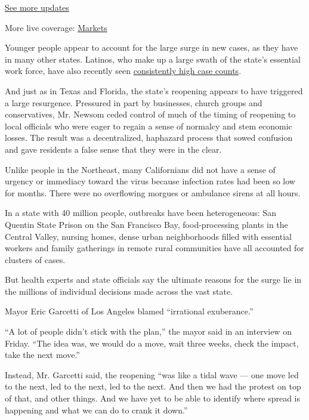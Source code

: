 \href{https://www.nytimes3xbfgragh.onion/2020/08/04/world/coronavirus-cases.html?action=click\&pgtype=Article\&state=default\&region=MAIN_CONTENT_1\&context=storylines_live_updates}{See
more updates}

More live coverage:
\href{https://www.nytimes3xbfgragh.onion/live/2020/08/04/business/stock-market-today-coronavirus?action=click\&pgtype=Article\&state=default\&region=MAIN_CONTENT_1\&context=storylines_live_updates}{Markets}

Younger people appear to account for the large surge in new cases, as
they have in many other states. Latinos, who make up a large swath of
the state's essential work force, have also recently seen
\href{https://www.nytimes3xbfgragh.onion/2020/06/26/us/corona-virus-latinos.html}{consistently
high case counts}.

And just as in Texas and Florida, the state's reopening appears to have
triggered a large resurgence. Pressured in part by businesses, church
groups and conservatives, Mr. Newsom ceded control of much of the timing
of reopening to local officials who were eager to regain a sense of
normalcy and stem economic losses. The result was a decentralized,
haphazard process that sowed confusion and gave residents a false sense
that they were in the clear.

Unlike people in the Northeast, many Californians did not have a sense
of urgency or immediacy toward the virus because infection rates had
been so low for months. There were no overflowing morgues or ambulance
sirens at all hours.

In a state with 40 million people, outbreaks have been heterogeneous:
San Quentin State Prison on the San Francisco Bay, food-processing
plants in the Central Valley, nursing homes, dense urban neighborhoods
filled with essential workers and family gatherings in remote rural
communities have all accounted for clusters of cases.

But health experts and state officials say the ultimate reasons for the
surge lie in the millions of individual decisions made across the vast
state.

Mayor Eric Garcetti of Los Angeles blamed ``irrational exuberance.''

``A lot of people didn't stick with the plan,'' the mayor said in an
interview on Friday. ``The idea was, we would do a move, wait three
weeks, check the impact, take the next move.''

Instead, Mr. Garcetti said, the reopening ``was like a tidal wave ---
one move led to the next, led to the next, led to the next. And then we
had the protest on top of that, and other things. And we have yet to be
able to identify where spread is happening and what we can do to crank
it down.''

